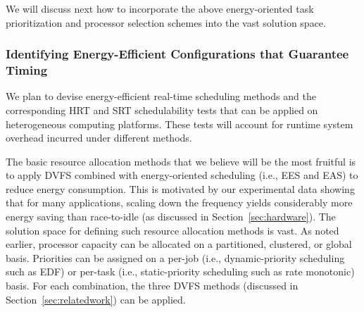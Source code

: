 We will discuss next how to incorporate the above energy-oriented task prioritization and processor selection schemes into the vast solution space.

\subsubsection{Identifying Energy-Efficient Configurations that Guarantee Timing}
\label{sec:step1Config}

We plan to devise energy-efficient real-time scheduling methods and the corresponding HRT and SRT schedulability tests that can be applied on heterogeneous computing platforms. These tests will account for runtime system overhead incurred under different methods.

The basic resource allocation methods that we believe will be the most fruitful is to apply DVFS combined with energy-oriented scheduling (i.e., EES and EAS) to reduce energy consumption. This is motivated by our experimental data showing that for many applications, scaling down the frequency yields considerably more energy saving than race-to-idle (as discussed in Section~\ref{sec:hardware}). The solution space for defining such resource allocation methods is vast. As noted earlier, processor capacity can be allocated on a partitioned, clustered, or global basis. Priorities can be assigned on a per-job (i.e., dynamic-priority scheduling such as EDF) or per-task (i.e., static-priority scheduling such as rate monotonic) basis. For each combination, the three DVFS methods (discussed in Section~\ref{sec:relatedwork}) can be applied.

